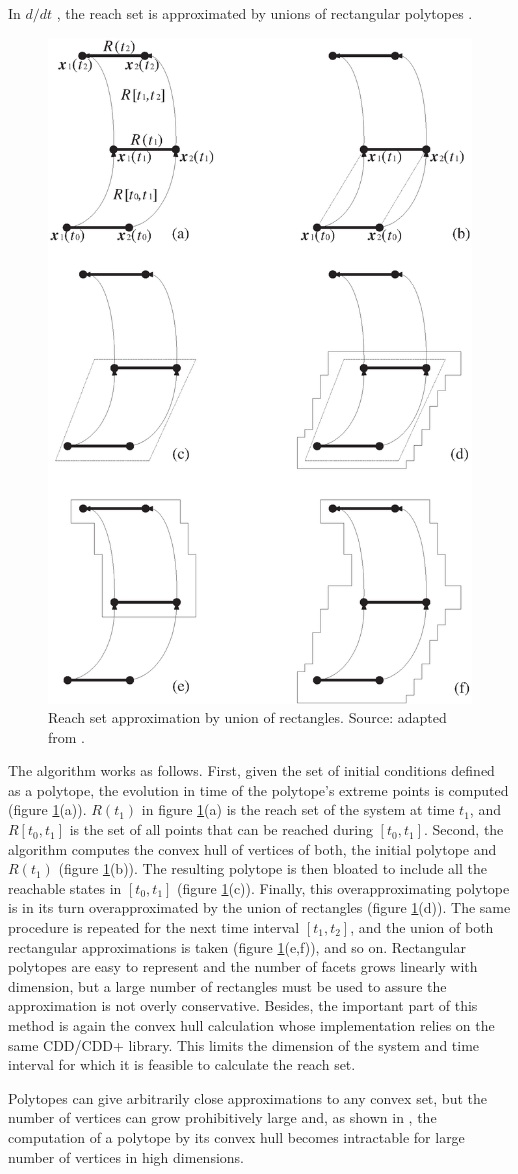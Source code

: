 In $d/dt$ \cite{ddt},
the reach set is approximated by unions of rectangular polytopes \cite{maler}.
\begin{figure}[htbp]
\centerline{
\includegraphics[width=6.5 cm, height=8 cm]{ddt.eps}}
\caption{Reach set approximation by union of rectangles.
Source: adapted from \cite{maler}.}
\label{ddtfig}
\end{figure}
The algorithm works as follows. First, given the set of initial conditions
defined as a polytope, the evolution in time of the polytope's extreme points
is computed (figure \ref{ddtfig}(a)).
$R(t_1)$ in figure \ref{ddtfig}(a) is the
reach set of the system at time $t_1$, and $R[t_0, t_1]$ is the set of all
points that can be reached during $[t_0, t_1]$. Second, the
algorithm computes the convex hull of vertices of both, the initial polytope
and $R(t_1)$ (figure \ref{ddtfig}(b)).
The resulting polytope is then bloated to include
all the reachable states in $[t_0,t_1]$
(figure \ref{ddtfig}(c)). Finally, this overapproximating polytope is in its
turn overapproximated by the union of rectangles (figure \ref{ddtfig}(d)).
The same procedure is repeated for the next time interval $[t_1,t_2]$, and
the union of both rectangular approximations is taken
(figure \ref{ddtfig}(e,f)), and so on.
Rectangular polytopes are easy to represent and the number
of facets grows linearly with dimension, but a large number of rectangles
must be used to assure the approximation is not overly conservative.
Besides, the important part of this method is again the convex hull
calculation whose implementation relies on the same CDD/CDD+
library. This limits the dimension of the system and time interval
for which it is feasible to calculate the reach set.

Polytopes can give arbitrarily close approximations to any convex set,
but the number of vertices can grow prohibitively large and,
as shown in \cite{avis}, the computation of a polytope by its convex hull
becomes intractable for large number of vertices in high dimensions.

